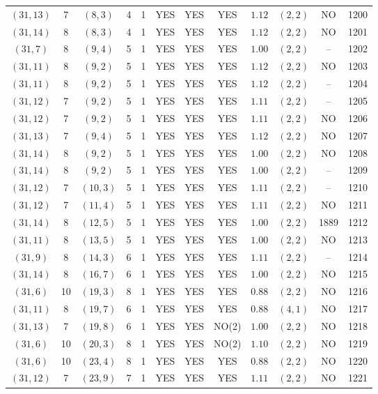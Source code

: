 \begin{longtable}{|c|c|c|c|c|c|c|c|c|c|c|c|}
$(31,13)$ & 7 & $(8,3)$ & 4 & 1 & YES & YES & YES & $1.12$ & $(2,2)$ & NO & 1200\\
$(31,14)$ & 8 & $(8,3)$ & 4 & 1 & YES & YES & YES & $1.12$ & $(2,2)$ & NO & 1201\\
$(31,7)$ & 8 & $(9,4)$ & 5 & 1 & YES & YES & YES & $1.00$ & $(2,2)$ & -- & 1202\\
$(31,11)$ & 8 & $(9,2)$ & 5 & 1 & YES & YES & YES & $1.12$ & $(2,2)$ & NO & 1203\\
$(31,11)$ & 8 & $(9,2)$ & 5 & 1 & YES & YES & YES & $1.12$ & $(2,2)$ & -- & 1204\\
$(31,12)$ & 7 & $(9,2)$ & 5 & 1 & YES & YES & YES & $1.11$ & $(2,2)$ & -- & 1205\\
$(31,12)$ & 7 & $(9,2)$ & 5 & 1 & YES & YES & YES & $1.11$ & $(2,2)$ & NO & 1206\\
$(31,13)$ & 7 & $(9,4)$ & 5 & 1 & YES & YES & YES & $1.12$ & $(2,2)$ & NO & 1207\\
$(31,14)$ & 8 & $(9,2)$ & 5 & 1 & YES & YES & YES & $1.00$ & $(2,2)$ & NO & 1208\\
$(31,14)$ & 8 & $(9,2)$ & 5 & 1 & YES & YES & YES & $1.00$ & $(2,2)$ & -- & 1209\\
$(31,12)$ & 7 & $(10,3)$ & 5 & 1 & YES & YES & YES & $1.11$ & $(2,2)$ & -- & 1210\\
$(31,12)$ & 7 & $(11,4)$ & 5 & 1 & YES & YES & YES & $1.11$ & $(2,2)$ & NO & 1211\\
$(31,14)$ & 8 & $(12,5)$ & 5 & 1 & YES & YES & YES & $1.00$ & $(2,2)$ & 1889 & 1212\\
$(31,11)$ & 8 & $(13,5)$ & 5 & 1 & YES & YES & YES & $1.00$ & $(2,2)$ & NO & 1213\\
$(31,9)$ & 8 & $(14,3)$ & 6 & 1 & YES & YES & YES & $1.11$ & $(2,2)$ & -- & 1214\\
$(31,14)$ & 8 & $(16,7)$ & 6 & 1 & YES & YES & YES & $1.00$ & $(2,2)$ & NO & 1215\\
$(31,6)$ & 10 & $(19,3)$ & 8 & 1 & YES & YES & YES & $0.88$ & $(2,2)$ & NO & 1216\\
$(31,11)$ & 8 & $(19,7)$ & 6 & 1 & YES & YES & YES & $0.88$ & $(4,1)$ & NO & 1217\\
$(31,13)$ & 7 & $(19,8)$ & 6 & 1 & YES & YES & NO(2) & $1.00$ & $(2,2)$ & NO & 1218\\
$(31,6)$ & 10 & $(20,3)$ & 8 & 1 & YES & YES & NO(2) & $1.10$ & $(2,2)$ & NO & 1219\\
$(31,6)$ & 10 & $(23,4)$ & 8 & 1 & YES & YES & YES & $0.88$ & $(2,2)$ & NO & 1220\\
$(31,12)$ & 7 & $(23,9)$ & 7 & 1 & YES & YES & YES & $1.11$ & $(2,2)$ & NO & 1221\\

\end{longtable}

